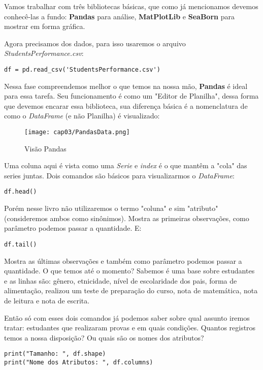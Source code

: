 Vamos trabalhar com três bibliotecas básicas, que como já mencionamos devemos conhecê-las a fundo: \textbf{Pandas} para análise, \textbf{MatPlotLib} e \textbf{SeaBorn} para mostrar em forma gráfica.

Agora precisamos dos dados, para isso usaremos o arquivo \textit{StudentsPerformance.csv}:
\begin{lstlisting}[]
df = pd.read_csv('StudentsPerformance.csv')
\end{lstlisting}

Nessa fase compreendemos melhor o que temos na nossa mão, \textbf{Pandas} é ideal para essa tarefa. Seu funcionamento é como um "Editor de Planilha", dessa forma que devemos encarar essa biblioteca, sua diferença básica é a nomenclatura de como o \textit{DataFrame} (e não Planilha) é visualizado:
\begin{figure}[H]
	\centering
	\texttt{[image: cap03/PandasData.png]}
	\caption{Visão Pandas}
\end{figure}

Uma coluna aqui é vista como uma \textit{Serie} e \textit{index} é o que mantêm a "cola" das series juntas. Dois comandos são básicos para visualizarmos o \textit{DataFrame}:
\begin{lstlisting}[]
df.head()
\end{lstlisting}

Porém nesse livro não utilizaremos o termo "coluna" e sim "atributo" (consideremos ambos como sinônimos). Mostra as primeiras observações, como parâmetro podemos passar a quantidade. E:
\begin{lstlisting}[]
df.tail()
\end{lstlisting}

Mostra as últimas observações e também como parâmetro podemos passar a quantidade. O que temos até o momento? Sabemos é uma base sobre estudantes e as linhas são: gênero, etnicidade, nível de escolaridade dos pais, forma de alimentação, realizou um teste de preparação do curso, nota de matemática, nota de leitura e nota de escrita.

Então só com esses dois comandos já podemos saber sobre qual assunto iremos tratar: estudantes que realizaram provas e em quais condições. Quantos registros temos a nossa disposição? Ou quais são os nomes dos atributos?
\begin{lstlisting}[]
print("Tamanho: ", df.shape)
print("Nome dos Atributos: ", df.columns)
\end{lstlisting}


